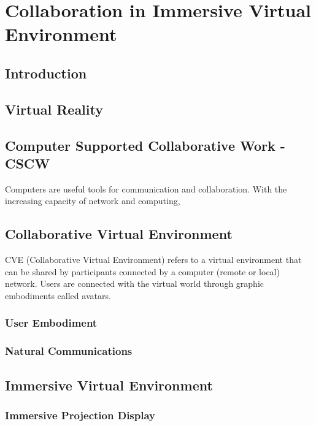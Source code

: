 \chapter{Collaboration in Immersive Virtual Environment}
\label{chapter:context}
\minitoc


\section{Introduction}

\section{Virtual Reality}

\section{Computer Supported Collaborative Work - CSCW}
Computers are useful tools for communication and collaboration. With the increasing capacity of network and computing, 

\section{Collaborative Virtual Environment}
CVE (Collaborative Virtual Environment) refers to a virtual environment that can be shared by participants connected by a computer (remote or local) network. Users are connected with the virtual world through graphic embodiments called avatars.

\subsection{User Embodiment}

\subsection{Natural Communications}

\section{Immersive Virtual Environment}


\subsection{Immersive Projection Display}

